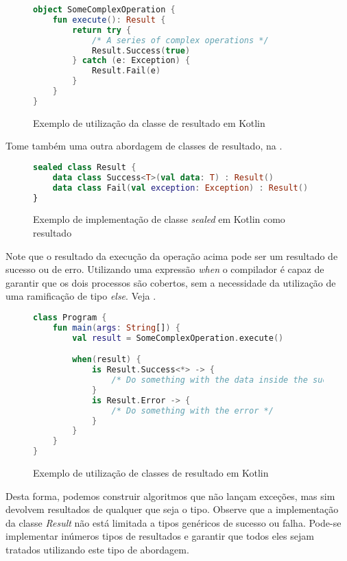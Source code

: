\begin{figure}[H]
    \centering
    \begin{lstlisting}[language=Kotlin]
object SomeComplexOperation {
    fun execute(): Result {
        return try {
            /* A series of complex operations */
            Result.Success(true)
        } catch (e: Exception) {
            Result.Fail(e)
        }
    }
}
    \end{lstlisting}
    \caption{Exemplo de utilização da classe de resultado em Kotlin}
    \label{fig:kotlin_result_implementation}
\end{figure}

Tome também uma outra abordagem de classes de resultado, na .

\begin{figure}[H]
    \centering
    \begin{lstlisting}[language=Kotlin]
sealed class Result {
    data class Success<T>(val data: T) : Result()
    data class Fail(val exception: Exception) : Result()
}
    \end{lstlisting}
    \caption{Exemplo de implementação de classe \textit{sealed} em Kotlin como resultado}
    \label{fig:kotlin_result_sealed_type}
\end{figure}

Note que o resultado da execução da operação acima pode ser um resultado de sucesso ou de erro. Utilizando uma expressão \textit{when} o compilador é capaz de garantir que os dois processos são cobertos, sem a necessidade da utilização de uma ramificação de tipo \textit{else}. Veja .

\begin{figure}[H]
    \centering
    \begin{lstlisting}[language=Kotlin]
class Program {
    fun main(args: String[]) {
        val result = SomeComplexOperation.execute()

        when(result) {
            is Result.Success<*> -> {
                /* Do something with the data inside the success object */
            }
            is Result.Error -> {
                /* Do something with the error */
            }
        }
    }
}
    \end{lstlisting}
    \caption{Exemplo de utilização de classes de resultado em Kotlin}
    \label{fig:kotlin_result_class_example}
\end{figure}

Desta forma, podemos construir algoritmos que não lançam exceções, mas sim devolvem resultados de qualquer que seja o tipo. Observe que a implementação da classe \textit{Result} não está limitada a tipos genéricos de sucesso ou falha. Pode-se implementar inúmeros tipos de resultados e garantir que todos eles sejam tratados utilizando este tipo de abordagem.

